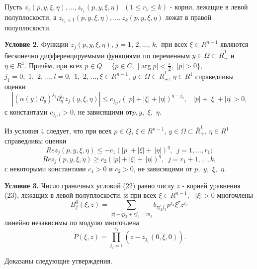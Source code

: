 Пусть $z_1 (p,y,\xi ,\eta ),...,z_{r_1 } (p,y,\xi ,\eta )\,\,\,(1 \leqslant r_1
\leqslant k)$ - корни, лежащие в левой полуплоскости, а $z_{r_1 + 1} (p,y,\xi
,\eta ),...,z_k (p,y,\xi ,\eta )$ лежат в правой полуплоскости.

\textbf{Условие 2.} Функции $z_j (p,y,\xi ,\eta )$, $j = 1,\,2,...,\,k,$ при
всех $\xi \in R^{n - 1}$ являются бесконечно дифференцируемыми функциями по
переменным $y \in \Omega \subset \bar {R}_ + ^1 $ и $\eta \in R^1$. Причём,
при всех $p \in Q = \{p \in C,\,\,\left| {\arg p} \right| < \frac{\pi
}{2},\,\,\left| p \right| > 0\}$, $j_1 = 0,\,\,1,\,\,2,\,...,l =
0,\,\,1,\,\,2,\,...,\xi \in R^{n - 1}$, $y \in \Omega \subset \bar {R}_ +
^1 $, $\eta \in R^1$ справедливы оценки
\[
\left| {(\alpha (y)\partial _y )^{j_1 }\partial _\eta ^{j_2 } z_j (y,\xi
,\eta )} \right| \leqslant c_{j_1 ,l} (\left| p \right| + \left| \xi \right| +
\left| \eta \right|)^{q - j_2 },\,\,\,\,\,\left| p \right| + \left| \xi
\right| + \left| \eta \right| > 0,
\]
с константами $c_{j_1 ,l} > 0$, не зависящими от$p,y,\,\,\xi ,\,\,\eta .$

Из условия 4 следует, что при всех $p \in Q$, $\xi \in R^{n - 1}$, $y \in
\Omega \subset \bar {R}_ + ^1 $, $\eta \in R^1$ справедливы оценки
\begin{equation}
\label{eq4705}
Rez_j (p,y,\xi ,\eta ) \leqslant - c_1 (\left| p \right| + \left| \xi \right| +
\,\left| \eta \right|)^q,\,\,\,j = 1,...,r_1 ;
\end{equation}
\begin{equation}
\label{eq4706}
Rez_j (p,y,\xi ,\eta ) \geqslant c_2 (\left| p \right| + \left| \xi \right| +
\,\left| \eta \right|)^q,\,\,\,j = r_1 + 1,...,k,
\end{equation}
с некоторыми константами $c_1 >0$
и $c_2 > 0$, не зависящими
от $p,\,\,y,\,\,\xi ,\,\,\eta $.

\textbf{Условие 3.} Число граничных условий (22) равно числу $z$ - корней
уравнения (23), лежащих в левой полуплоскости, и при всех $\xi \in R^{n -
1},\,\,\,\,\left| \xi \right| > 0$ многочлены $$B_j^0 (\xi ,z) =
\sum\limits_{\left| \tau \right| + qj_2 + rj_3 = m_j } {b_{\tau j_2 j_3 }
p^{j_3 }} \xi ^\tau z^{j_2 }\,$$ линейно независимы по модулю многочлена
$$P(\xi ,z) = \prod\limits_{j_1 = 1}^{r_1 } {(z - z_{j_1 } (0,\xi ,0))} .$$

Доказаны следующие утверждения.

